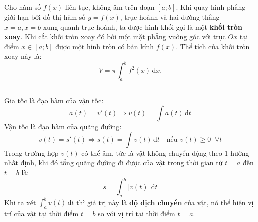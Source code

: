 \documentclass[12pt,a4paper]{extarticle}
\begin{document}
\subsection*{\color{myblue}{b) Thể tích khối tròn xoay}}
\begin{tcolorbox}[colback=lightblue, colframe=myblue, arc=2mm]
Cho hàm số $f(x)$ liên tục, không âm trên đoạn $[a; b]$.
\vspace{0.2cm}
Khi quay hình phẳng giới hạn bởi đồ thị hàm số $y = f(x)$, trục hoành và hai đường thẳng $x = a, x = b$ xung quanh trục hoành, ta được hình khối gọi là một \textbf{khối tròn xoay}.
\vspace{0.2cm}
Khi cắt khối tròn xoay đó bởi một mặt phẳng vuông góc với trục $Ox$ tại điểm $x \in [a; b]$ được một hình tròn có bán kính $f(x)$.
\vspace{0.2cm}
Thể tích của khối tròn xoay này là:
\[
V = \pi \int_{a}^{b} f^2(x) \, \mathrm{d}x.
\]
\end{tcolorbox}
\subsection*{\color{myblue}{c) Ứng dụng tích phân trong toán chuyển động}}
\begin{tcolorbox}[colback=lightblue, colframe=myblue, arc=2mm]
\noindent Gia tốc là đạo hàm của vận tốc:
\[
a(t) = v'(t) \Rightarrow v(t) = \int a(t) \, \mathrm{d}t
\]
\noindent Vận tốc là đạo hàm của quãng đường:
\[
v(t) = s'(t) \Rightarrow s(t) = \int v(t) \, \mathrm{d}t \quad \text{nếu } v(t) \ge 0 \;\; \forall t
\]
\noindent Trong trường hợp $v(t)$ có thể âm, tức là vật không chuyển động theo 1 hướng nhất định, khi đó tổng quãng đường đi được của vật trong thời gian từ $t = a$ đến $t = b$ là:
\[
s = \int_{a}^{b} |v(t)| \, \mathrm{d}t
\]
\vspace{0.2cm}
\noindent Khi ta xét $\int_{a}^{b} v(t) \, \mathrm{d}t$ thì giá trị này là \textbf{độ dịch chuyển} của vật, nó thể hiện vị trí của vật tại thời điểm $t = b$ so với vị trí tại thời điểm $t = a$.
\end{tcolorbox}
\vspace{0.4cm}
\subsection*{\color{myblue}{d) Thể tích, diện tích chảo Parabol}}
\end{document}
